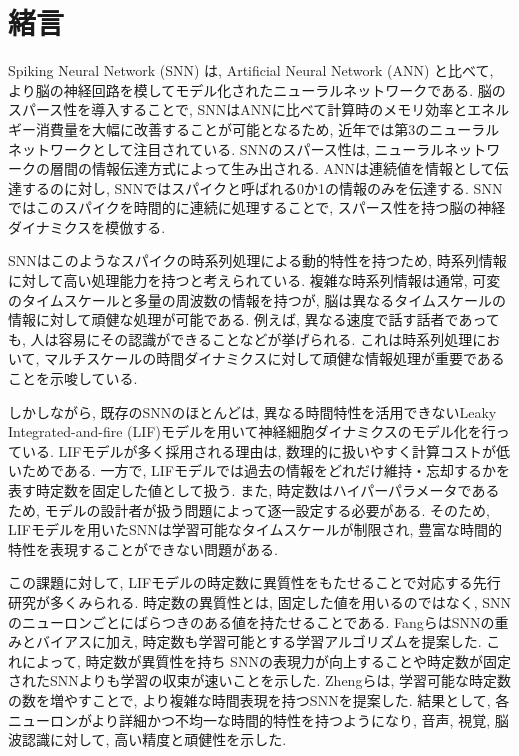 \section{緒言}
Spiking Neural Network (SNN) は, Artificial Neural Network (ANN) と比べて, より脳の神経回路を模してモデル化されたニューラルネットワークである\cite{TAVANAEI201947}.
脳のスパース性を導入することで, SNNはANNに比べて計算時のメモリ効率とエネルギー消費量を大幅に改善することが可能となるため, 近年では第3のニューラルネットワークとして注目されている\cite{Henkes2024}.
SNNのスパース性は, ニューラルネットワークの層間の情報伝達方式によって生み出される.
ANNは連続値を情報として伝達するのに対し, SNNではスパイクと呼ばれる0か1の情報のみを伝達する.
SNNではこのスパイクを時間的に連続に処理することで, スパース性を持つ脳の神経ダイナミクスを模倣する.

SNNはこのようなスパイクの時系列処理による動的特性を持つため, 時系列情報に対して高い処理能力を持つと考えられている\cite{zheng2024temporal}.
複雑な時系列情報は通常, 可変のタイムスケールと多量の周波数の情報を持つが, 脳は異なるタイムスケールの情報に対して頑健な処理が可能である\cite{10.1162/jocn_a_01615}.
例えば, 異なる速度で話す話者であっても, 人は容易にその認識ができることなどが挙げられる.
これは時系列処理において, マルチスケールの時間ダイナミクスに対して頑健な情報処理が重要であることを示唆している.

しかしながら, 既存のSNNのほとんどは, 異なる時間特性を活用できないLeaky Integrated-and-fire (LIF)モデルを用いて神経細胞ダイナミクスのモデル化を行っている\cite{dayan2003theoretical}.
LIFモデルが多く採用される理由は, 数理的に扱いやすく計算コストが低いためである.
一方で, LIFモデルでは過去の情報をどれだけ維持・忘却するかを表す時定数を固定した値として扱う.
また, 時定数はハイパーパラメータであるため, モデルの設計者が扱う問題によって逐一設定する必要がある.
そのため, LIFモデルを用いたSNNは学習可能なタイムスケールが制限され, 豊富な時間的特性を表現することができない問題がある.

この課題に対して, LIFモデルの時定数に異質性をもたせることで対応する先行研究が多くみられる\cite{10.1145/3407197.3407225}\cite{fang2021incorporating}.
時定数の異質性とは, 固定した値を用いるのではなく, SNNのニューロンごとにばらつきのある値を持たせることである.
Fangら\cite{fang2021incorporating}はSNNの重みとバイアスに加え, 時定数も学習可能とする学習アルゴリズムを提案した.
これによって, 時定数が異質性を持ち SNNの表現力が向上することや時定数が固定されたSNNよりも学習の収束が速いことを示した.
Zhengら\cite{zheng2024temporal}は, 学習可能な時定数の数を増やすことで, より複雑な時間表現を持つSNNを提案した.
結果として, 各ニューロンがより詳細かつ不均一な時間的特性を持つようになり, 音声, 視覚, 脳波認識に対して, 高い精度と頑健性を示した.

